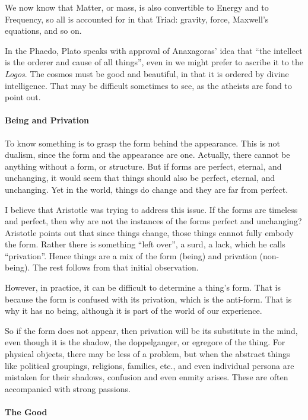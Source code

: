 We now know that Matter, or mass, is also convertible to Energy and to Frequency, so all is accounted for in that Triad: gravity, force, Maxwell's equations, and so on.

In the Phaedo, Plato speaks with approval of Anaxagoras' idea that ``the intellect is the orderer and cause of all things'', even in we might prefer to ascribe it to the \emph{Logos}. The cosmos must be good and beautiful, in that it is ordered by divine intelligence. That may be difficult sometimes to see, as the atheists are fond to point out.

\paragraph{Being and Privation}


To know something is to grasp the form behind the appearance. This is not dualism, since the form and the appearance are one. Actually, there cannot be anything without a form, or structure. But if forms are perfect, eternal, and unchanging, it would seem that things should also be perfect, eternal, and unchanging. Yet in the world, things do change and they are far from perfect.

I believe that Aristotle was trying to address this issue. If the forms are timeless and perfect, then why are not the instances of the forms perfect and unchanging? Aristotle points out that since things change, those things cannot fully embody the form. Rather there is something ``left over'', a surd, a lack, which he calls ``privation''. Hence things are a mix of the form (being) and privation (non-being). The rest follows from that initial observation.

However, in practice, it can be difficult to determine a thing's form. That is because the form is confused with its privation, which is the anti-form. That is why it has no being, although it is part of the world of our experience.

So if the form does not appear, then privation will be its substitute in the mind, even though it is the shadow, the doppelganger, or egregore of the thing. For physical objects, there may be less of a problem, but when the abstract things like political groupings, religions, families, etc., and even individual persona are mistaken for their shadows, confusion and even enmity arises. These are often accompanied with strong passions.

\paragraph{The Good}


